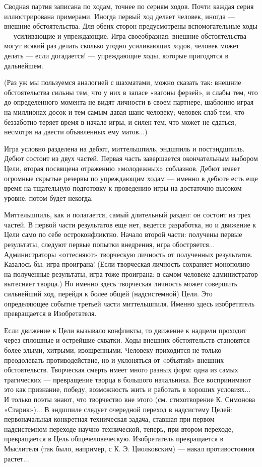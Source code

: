 Сводная партия записана по ходам, точнее по сериям ходов. Почти каждая
серия  иллюстрирована примерами.  Иногда  первый  ход делает  человек,
иногда  —  внешние  обстоятельства.  Для  обеих  сторон  предусмотрены
вспомогательные ходы  — усиливающие и упреждающие.  Игра своеобразная:
внешние  обстоятельства   могут  всякий  раз  делать   сколько  угодно
усиливающих  ходов,   человек  может  делать  —   если  догадается!  —
упреждающие ходы, которые пригодятся в дальнейшем.

(Раз  уж  мы пользуемся  аналогией  с  шахматами, можно  сказать  так:
внешние обстоятельства сильны тем, что у них в запасе «вагоны ферзей»,
и слабы  тем, что до определенного  момента не видят личности  в своем
партнере, шаблонно  играя на  миллионах досок и  тем самым  давая шанс
человеку; человек слаб тем, что беззаботно теряет время в начале игры,
и силен тем, что может не  сдаться, несмотря на двести объявленных ему
матов...)

Игра   условно   разделена   на  дебют,   миттельшпиль,   эндшпиль   и
постэндшпиль. Дебют  состоит из двух частей.  Первая часть завершается
окончательным  выбором Цели,  вторая посвящена  отражению «молодежных»
соблазнов. Дебют имеет огромные скрытые резервы по упреждающим ходам —
именно в дебюте  есть еще время на тщательную  подготовку к проведению
игры на достаточно высоком уровне, потом будет некогда.

Миттельшпиль, как и полагается, самый длительный раздел: он состоит из
трех частей. В  первой части результатов еще  нет, ведется разработка,
но  и движение  к Цели  само  по себе  остроконфликтно. Начало  второй
части: получены  первые результаты, следуют первые  попытки внедрения,
игра обостряется... Администраторы  «оттесняют» творческую личность от
полученных результатов. Казалось бы,  игра проиграна! (Если творческая
личность  сохраняет  монополию  на полученные  результаты,  игра  тоже
проиграна:  в  самом  человеке  администратор  вытесняет  творца.)  Но
именно  здесь  творческая  личность может  совершить  сильнейший  ход,
перейдя к  более общей  (надсистемной) Цели. Это  определяющее событие
третьей части  миттельшпиля. Именно здесь изобретатель  превращается в
Изобретателя.

Если  движение  к  Цели  вызывало конфликты,  то  движение  к  надцели
проходит   через   сплошные   и  острейшие   схватки.   Ходы   внешних
обстоятельств становятся  более злыми, хитрыми,  изощренными. Человеку
приходится не только преодолевать  противодействие, но и уклоняться от
«объятий» внешних обстоятельств. Творческая  смерть имеет много разных
форм:  одна  из самых  трагических  —  превращение творца  в  большого
начальника. Все  воспринимают это  как признание,  победу, возможность
жить  и работать  в  хороших  условиях... И  только  поэты знают,  что
творчество  вне этого  (см. стихотворение  К. Симонова  «Старик»)... В
эндшпиле следует очередной переход  в надсистему Целей: первоначальная
конкретная  техническая   задача,  ставшая  при   первом  надсистемном
переходе научно-технической, теперь, при втором переходе, превращается
в Цель  общечеловеческую. Изобретатель  превращается в  Мыслителя (так
было, например, с К. Э. Циолковским) — накал противостояния растет...

